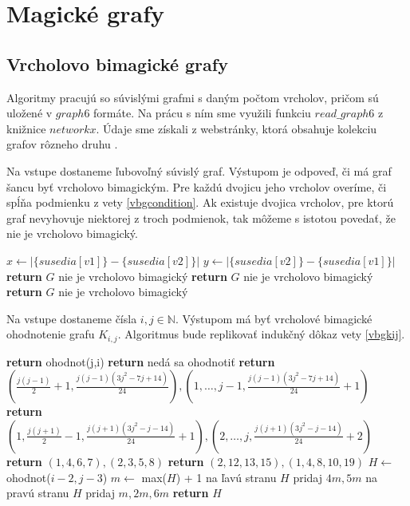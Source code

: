 \section{Magické grafy}

\subsection{Vrcholovo bimagické grafy}

Algoritmy pracujú so súvislými grafmi s daným počtom vrcholov, pričom sú uložené v $graph6$ formáte. Na prácu s ním sme využili funkciu $read \_ graph6$ z knižnice $networkx$. Údaje sme získali z webstránky, ktorá obsahuje kolekciu grafov rôzneho druhu \cite{graphlist}. \\
 
\begin{alg}
\label{algvbgcondition}
Na vstupe dostaneme ľubovoľný súvislý graf. Výstupom je odpoveď, či má graf šancu byť vrcholovo bimagickým. Pre každú dvojicu jeho vrcholov overíme, či spĺňa podmienku z vety \ref{vbgcondition}. Ak existuje dvojica vrcholov, pre ktorú graf nevyhovuje niektorej z troch podmienok, tak môžeme s istotou povedať, že nie je vrcholovo bimagický.
\end{alg}

\begin{algorithmic}
    \STATE $x \gets |\{susedia[v1]\} - \{susedia[v2]\}|$
    \STATE $y \gets |\{susedia[v2]\} - \{susedia[v1]\}|$
	\STATE \textbf{return} $G$ nie je vrcholovo bimagický
    \ENDIF
	\STATE \textbf{return} $G$ nie je vrcholovo bimagický
    \ENDIF
	\STATE \textbf{return} $G$ nie je vrcholovo bimagický
    \ENDIF
\ENDFOR
\end{algorithmic}


\begin{alg}
\label{algvbgkij}
Na vstupe dostaneme čísla $i,j \in \mathbb{N}$. Výstupom má byť vrcholové bimagické ohodnotenie grafu $K_{i,j}$. Algoritmus bude replikovať indukčný dôkaz vety \ref{vbgkij}.
\end{alg}

\begin{algorithmic}
	\STATE \textbf{return} ohodnot(j,i)
\ENDIF
{}
	\STATE \textbf{return} nedá sa ohodnotiť
\ENDIF
{}
	\STATE \textbf{return} $(\frac{j(j-1)}{2} + 1, \frac{j(j-1)(3j^2-7j+14)}{24}), (1, \dots , j-1, \frac{j(j-1)(3j^2-7j+14)}{24} + 1)$
\ENDIF
{}
	\STATE \textbf{return} $(1, \frac{j(j+1)}{2} - 1, \frac{j(j+1)(3j^2-j-14)}{24} + 1), (2, \dots , j, \frac{j(j+1)(3j^2-j-14)}{24} + 2)$
\ENDIF
{}
	\STATE \textbf{return} $(1, 4, 6, 7), (2, 3, 5, 8)$
\ENDIF
{}
	\STATE \textbf{return} $(2, 12, 13, 15), (1, 4, 8, 10, 19)$
\ENDIF
\STATE $H \gets$ ohodnot($i - 2, j - 3$)
\STATE $m \gets$ max($H$) + 1
\STATE na ľavú stranu $H$ pridaj $4m, 5m$
\STATE na pravú stranu $H$ pridaj $m, 2m, 6m$
\STATE \textbf{return} $H$
\end{algorithmic}


